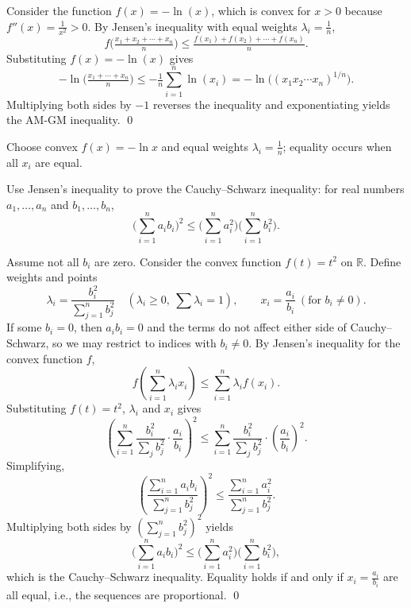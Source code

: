 \documentclass[12pt]{article}
\begin{document}
\begin{solution}
Consider the function $f(x) = -\ln(x)$, which is convex for $x > 0$ because $f''(x) = \tfrac{1}{x^2} > 0$.
By Jensen's inequality with equal weights $\lambda_i = \tfrac{1}{n}$,
\[
  f\Big(\tfrac{x_1 + x_2 + \cdots + x_n}{n}\Big) \le \tfrac{f(x_1) + f(x_2) + \cdots + f(x_n)}{n}.
\]
Substituting $f(x) = -\ln(x)$ gives
\[
  -\ln\Big(\tfrac{x_1 + \cdots + x_n}{n}\Big) \le -\tfrac{1}{n}\sum_{i=1}^n \ln(x_i) = -\ln\Big((x_1 x_2 \cdots x_n)^{1/n}\Big).
\]
Multiplying both sides by $-1$ reverses the inequality and exponentiating yields the AM-GM inequality. \qed
\end{solution}

\begin{takeaways}
  \item Choose convex $f(x)=-\ln x$ and equal weights $\lambda_i=\tfrac{1}{n}$; equality occurs when all $x_i$ are equal.
\end{takeaways}

\begin{examplebox}[title={\bfseries Example~\thetcbcounter: Cauchy--Schwarz via Jensen}]
Use Jensen's inequality to prove the Cauchy--Schwarz inequality: for real numbers $a_1,\dots,a_n$ and $b_1,\dots,b_n$,
\[
  \Big(\sum_{i=1}^n a_i b_i\Big)^2 \le \Big(\sum_{i=1}^n a_i^2\Big)\Big(\sum_{i=1}^n b_i^2\Big).
\]

\end{examplebox}

\begin{solution}
Assume not all $b_i$ are zero. Consider the convex function $f(t)=t^2$ on $\mathbb{R}$. Define weights and points
\[
  \lambda_i = \frac{b_i^2}{\sum_{j=1}^n b_j^2}\quad(\lambda_i\ge0,\ \sum \lambda_i=1),\qquad x_i = \frac{a_i}{b_i}\ (\text{for } b_i\ne0).
\]
If some $b_i=0$, then $a_i b_i=0$ and the terms do not affect either side of Cauchy--Schwarz, so we may restrict to indices with $b_i\ne0$.
By Jensen's inequality for the convex function $f$,
\[
  f\!\left(\sum_{i=1}^n \lambda_i x_i\right) \le \sum_{i=1}^n \lambda_i f(x_i).
\]
Substituting $f(t)=t^2$, $\lambda_i$ and $x_i$ gives
\[
  \left(\sum_{i=1}^n \frac{b_i^2}{\sum_{j} b_j^2}\cdot \frac{a_i}{b_i}\right)^2 \le \sum_{i=1}^n \frac{b_i^2}{\sum_{j} b_j^2}\cdot \left(\frac{a_i}{b_i}\right)^2.
\]
Simplifying,
\[
  \left(\frac{\sum_{i=1}^n a_i b_i}{\sum_{j=1}^n b_j^2}\right)^2 \le \frac{\sum_{i=1}^n a_i^2}{\sum_{j=1}^n b_j^2}.
\]
Multiplying both sides by $(\sum_{j=1}^n b_j^2)^2$ yields
\[
  \Big(\sum_{i=1}^n a_i b_i\Big)^2 \le \Big(\sum_{i=1}^n a_i^2\Big)\Big(\sum_{i=1}^n b_i^2\Big),
\]
which is the Cauchy--Schwarz inequality. Equality holds if and only if $x_i=\frac{a_i}{b_i}$ are all equal, i.e., the sequences are proportional. \qed
\end{solution}
\end{document}
